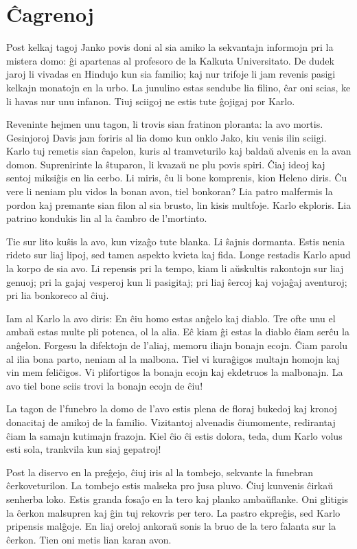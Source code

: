 \chapter{Ĉagrenoj}

Post kelkaj tagoj Janko povis doni al sia amiko la sekvantajn informojn pri la mistera domo: ĝi apartenas al profesoro de la Kalkuta Universitato. De dudek jaroj li vivadas en Hindujo kun sia familio; kaj nur trifoje li jam revenis pasigi kelkajn monatojn en la urbo. La junulino estas sendube lia filino, ĉar oni scias, ke li havas nur unu infanon. Tiuj sciigoj ne estis tute ĝojigaj por Karlo.

Reveninte hejmen unu tagon, li trovis sian fratinon ploranta: la avo mortis. Gesinjoroj Davis jam foriris al lia domo kun onklo Jako, kiu venis ilin sciigi. Karlo tuj remetis sian ĉapelon, kuris al tramveturilo kaj baldaŭ alvenis en la avan domon. Suprenirinte la ŝtuparon, li kvazaŭ ne plu povis spiri. Ĉiaj ideoj kaj sentoj miksiĝis en lia cerbo. Li miris, ĉu li bone komprenis, kion Heleno diris. Ĉu vere li neniam plu vidos la bonan avon, tiel bonkoran? Lia patro malfermis la pordon kaj premante sian filon al sia brusto, lin kisis multfoje. Karlo ekploris. Lia patrino kondukis lin al la ĉambro de l'mortinto.

Tie sur lito kuŝis la avo, kun vizaĝo tute blanka. Li ŝajnis dormanta. Estis nenia rideto sur liaj lipoj, sed tamen aspekto kvieta kaj fida. Longe restadis Karlo apud la korpo de sia avo. Li repensis pri la tempo, kiam li aŭskultis rakontojn sur liaj genuoj; pri la gajaj vesperoj kun li pasigitaj; pri liaj ŝercoj kaj vojaĝaj aventuroj; pri lia bonkoreco al ĉiuj.

Iam al Karlo la avo diris: En ĉiu homo estas anĝelo kaj diablo. Tre ofte unu el ambaŭ estas multe pli potenca, ol la alia. Eĉ kiam ĝi estas la diablo ĉiam serĉu la anĝelon. Forgesu la difektojn de l'aliaj, memoru iliajn bonajn ecojn. Ĉiam parolu al ilia bona parto, neniam al la malbona. Tiel vi kuraĝigos multajn homojn kaj vin mem feliĉigos. Vi plifortigos la bonajn ecojn kaj ekdetruos la malbonajn. La avo tiel bone sciis trovi la bonajn ecojn de ĉiu!

La tagon de l'funebro la domo de l'avo estis plena de floraj bukedoj kaj kronoj donacitaj de amikoj de la familio. Vizitantoj alvenadis ĉiumomente, redirantaj ĉiam la samajn kutimajn frazojn. Kiel ĉio ĉi estis dolora, teda, dum Karlo volus esti sola, trankvila kun siaj gepatroj!

Post la diservo en la preĝejo, ĉiuj iris al la tombejo, sekvante la funebran ĉerkoveturilon. La tombejo estis malseka pro ĵusa pluvo. Ĉiuj kunvenis ĉirkaŭ senherba loko. Estis granda fosaĵo en la tero kaj planko ambaŭflanke. Oni glitigis la ĉerkon malsupren kaj ĝin tuj rekovris per tero. La pastro ekpreĝis, sed Karlo pripensis malĝoje. En liaj oreloj ankoraŭ sonis la bruo de la tero falanta sur la ĉerkon. Tien oni metis lian karan avon.

